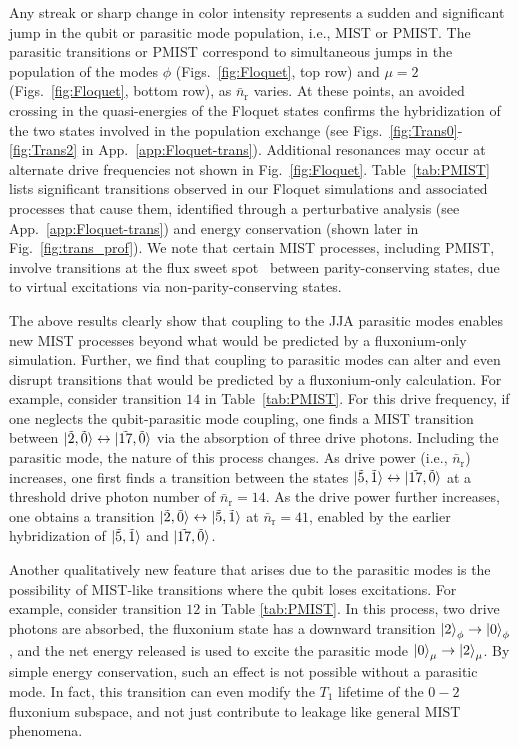 \documentclass[%
reprint,
superscriptaddress,
 amsmath,amssymb,
 aps,
 prx,
longbibliography,
floatfix,
]{revtex4-2}
\begin{document}
Any streak or sharp change in color intensity represents a sudden and significant jump in the qubit or parasitic mode population, i.e., MIST or PMIST. The parasitic transitions or PMIST correspond to simultaneous jumps in the population of the modes $\phi$ (Figs.~\ref{fig:Floquet}, top row) and $\mu=2$ (Figs.~\ref{fig:Floquet}, bottom row), as $\bar{n}_\textrm{r}$ varies. At these points, an avoided crossing in the quasi-energies of the Floquet states confirms the hybridization of the two states involved in the population exchange (see Figs.~\ref{fig:Trans0}-\ref{fig:Trans2} in App.~\ref{app:Floquet-trans}). Additional resonances may occur at alternate drive frequencies not shown in Fig.~\ref{fig:Floquet}. Table~\ref{tab:PMIST} lists significant transitions observed in our Floquet simulations and associated processes that cause them, identified through a perturbative analysis (see App.~\ref{app:Floquet-trans}) and energy conservation (shown later in Fig.~\ref{fig:trans_prof}). We note that certain MIST processes, including PMIST, involve transitions at the flux sweet spot~\cite{zhu_circuit_2013} between parity-conserving states, due to virtual excitations via non-parity-conserving states.

The above results clearly show that coupling to the JJA parasitic modes enables new MIST processes beyond what would be predicted by a fluxonium-only simulation. Further, we find that coupling to parasitic modes can alter and even disrupt transitions that would be predicted by a fluxonium-only calculation. For example, consider transition $14$ in Table~\ref{tab:PMIST}. For this drive frequency, if one neglects the qubit-parasitic mode coupling, one finds a MIST transition between $\ket{\tilde{2},\tilde{0}} \leftrightarrow \ket{\tilde{17},\tilde{0}}$ via the absorption of three drive photons. Including the parasitic mode, the nature of this process changes. As drive power (i.e., $\bar{n}_\textrm{r}$) increases, one first finds a transition between the states $\ket{\tilde{5},\tilde{1}}\leftrightarrow \ket{\tilde{17},\tilde{0}}$ at a threshold drive photon number of $\bar n_\textrm{r}=14$. As the drive power further increases, one obtains a transition $\ket{\tilde{2},\tilde{0}}\leftrightarrow \ket{\tilde{5},\tilde{1}}$ at $\bar n_\textrm{r}=41$, enabled by the earlier hybridization of $\ket{\tilde{5},\tilde{1}}$ and $\ket{\tilde{17},\tilde{0}}$.

Another qualitatively new feature that arises due to the parasitic modes is the possibility of MIST-like transitions where the qubit loses excitations. For example, consider transition $12$ in Table \ref{tab:PMIST}. In this process, two drive photons are absorbed, the fluxonium state has a downward transition $\ket{2}_\phi\rightarrow\ket{0}_\phi$, and the net energy released is used to excite the parasitic mode $\ket{0}_\mu\rightarrow \ket{2}_\mu$. By simple energy conservation, such an effect is not possible without a parasitic mode. In fact, this transition can even modify the $T_1$ lifetime of the $0-2$ fluxonium subspace, and not just contribute to leakage like general MIST phenomena.
\end{document}
